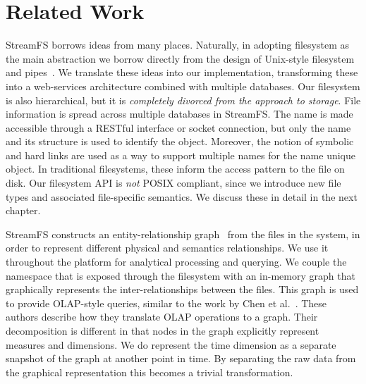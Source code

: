 \section{Related Work}
StreamFS borrows ideas from many places.  Naturally, in adopting filesystem as the main abstraction we borrow directly
from the design of Unix-style filesystem and pipes~\cite{Ritchie74theunix}.  We translate these ideas into 
our implementation, transforming these into a web-services architecture combined with multiple databases.
Our filesystem is also hierarchical, but it is \emph{completely divorced from the approach to storage}.  File information is
spread across multiple databases in StreamFS.  The name is made accessible through a RESTful interface or socket connection, but
only the name and its structure is used to identify the object.  Moreover, the notion of symbolic and hard links are
used as a way to support multiple names for the name unique object.  In traditional filesystems, these inform
the access pattern to the file on disk.  Our filesystem API is \emph{not} POSIX compliant, since we introduce new file types
and associated file-specific semantics.  We discuss these in detail in the next chapter.

StreamFS constructs an entity-relationship graph~\cite{Chen76theentity-relationship} from the files in the system, in order to 
represent different physical and semantics relationships.  We use it throughout the platform for analytical processing and querying.
We couple the namespace that is exposed through the filesystem with an in-memory graph that graphically represents the inter-relationships
between the files.  This graph is used to provide OLAP-style queries, similar to the work by Chen et al.~\cite{Chen2008_olapgraph}.  
These authors describe how they translate OLAP operations to a graph.  Their decomposition is different in that nodes in the graph 
explicitly represent measures and dimensions.  We do represent the time dimension as a separate snapshot of the graph at another
point in time.  By separating the raw data from the graphical representation this becomes a trivial transformation.

